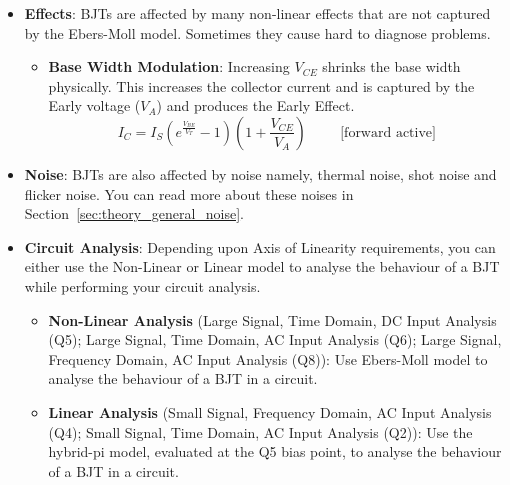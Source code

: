 \begin{itemize}
\begin{itemize}
\begin{itemize}
            current gain is usually \(B_F = 100\).
            \[
              I_B = \frac{I_C}{B_F}
            \]
          \item Find the base resistor \(R_B\) to limit the base current
            to \(I_B\).
            \[
              R_B = \frac{V_{IN} - V_{BE}}{I_B}
            \]
        \end{itemize}
    \end{itemize}
  \item \textbf{Effects}:
    BJTs are affected by many non-linear effects that are not captured by
    the Ebers-Moll model. Sometimes they cause hard to diagnose problems.
    \begin{itemize}
        \item \textbf{Base Width Modulation}: Increasing \(V_{CE}\) shrinks the base
          width physically. This increases the collector current and is captured
          by the Early voltage (\(V_A\)) and produces the Early Effect.
          \[
            I_C = I_{S} \left( e^{\frac{V_{BE}}{V_T}} - 1 \right) \left( 1 + \frac{V_{CE}}{V_A} \right) \hspace{1cm} \text{[forward active]}
          \]
    \end{itemize}
  \item \textbf{Noise}:
      BJTs are also affected by noise namely, thermal noise, shot noise and flicker
      noise. You can read more about these noises in Section~\ref{sec:theory_general_noise}.
  \item \textbf{Circuit Analysis}:
    Depending upon Axis of Linearity requirements, you can either use the
    Non-Linear or Linear model to analyse the behaviour of a BJT while
    performing your circuit analysis.
    \begin{itemize}
      \item \textbf{Non-Linear Analysis} (Large Signal, Time Domain, DC
        Input Analysis (Q5); Large Signal, Time Domain, AC Input Analysis
        (Q6); Large Signal, Frequency Domain, AC Input Analysis (Q8)):
        Use Ebers-Moll model to analyse the behaviour of a BJT in a circuit.
      \item \textbf{Linear Analysis} (Small Signal, Frequency Domain, AC
        Input Analysis (Q4); Small Signal, Time Domain, AC Input Analysis
        (Q2)):
        Use the hybrid-pi model, evaluated at the Q5 bias point, to analyse
        the behaviour of a BJT in a circuit.
    \end{itemize}
\end{itemize}
